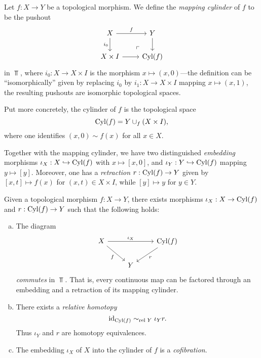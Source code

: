 \begin{definition}
    \label{def:mapping-cylinder}
    Let \(f: X \to Y\) be a topological morphism. We define the \emph{mapping
        cylinder} of \(f\) to be the pushout
    \[
        \begin{tikzcd}
            X \ar[r, "f"] \ar[d, "i_0"']
            \ar[rd, phantom, very near end, "\ulcorner"]
            &Y \ar[d] \\
            X \times I \ar[r] &\Cyl(f)
        \end{tikzcd}
    \]
    in \(\Top\), where \(i_0: X \to X \times I\) is the morphism
    \(x \mapsto (x, 0)\)---the definition can be ``isomorphically'' given by
    replacing \(i_0\) by \(i_1: X \to X \times I\) mapping \(x \mapsto (x, 1)\), the
    resulting pushouts are isomorphic topological spaces.

    Put more concretely, the cylinder of \(f\) is the topological space
    \[
        \operatorname{Cyl}(f) = Y \cup_f (X \times I),
    \]
    where one identifies \((x, 0) \sim f(x)\) for all \(x \in X\).

    Together with the mapping cylinder, we have two distinguished \emph{embedding}
    morphisms \(\iota_X: X \hookrightarrow \operatorname{Cyl}(f)\) with \(x \mapsto [x, 0]\), and
    \(\iota_Y: Y \hookrightarrow \operatorname{Cyl}(f)\) mapping \(y \mapsto [y]\). Moreover, one has a
    \emph{retraction}  \(r: \operatorname{Cyl}(f) \to Y\) given by \([x, t] \mapsto f(x)\) for
    \((x, t) \in X \times I\), while \([y] \mapsto y\) for \(y \in Y\).
\end{definition}

\begin{theorem}
    \label{thm:factorization-morphism-embedding-retraction}
    Given a topological morphism \(f: X \to Y\), there exists morphisms
    \(\iota_X: X \to \operatorname{Cyl}(f)\) and \(r: \operatorname{Cyl}(f) \to Y\) such that the following
    holds:
    \begin{enumerate}[(a)]\setlength\itemsep{0em}
        \item The diagram
              \[
                  \begin{tikzcd}
                      X \ar[rr, "\iota_X"] \ar[dr, "f"'] & &\Cyl(f) \ar[ld, "r"] \\
                      &Y &
                  \end{tikzcd}
              \]
              \emph{commutes} in \(\Top\). That is, every continuous map can be factored
              through an embedding and a retraction of its mapping cylinder.

        \item There exists a \emph{relative homotopy}
              \[
                  \operatorname{id}_{\operatorname{Cyl}(f)} \sim_{\text{rel }{Y}} \iota_Y r.
              \]
              Thus \(\iota_Y\) and \(r\) are homotopy equivalences.

        \item The embedding \(\iota_X\) of \(X\) into the cylinder of \(f\) is a
              \emph{cofibration}.
    \end{enumerate}
\end{theorem}

